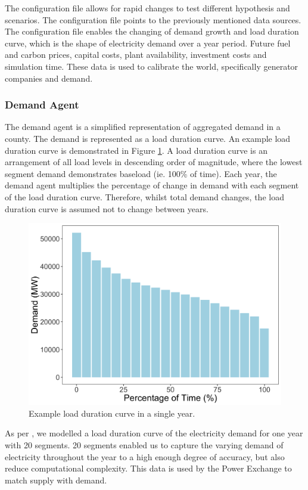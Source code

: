 The configuration file allows for rapid changes to test different hypothesis and scenarios. The configuration file points to the previously mentioned data sources. The configuration file enables the changing of demand growth and load duration curve, which is the shape of electricity demand over a year period. Future fuel and carbon prices, capital costs, plant availability, investment costs and simulation time. These data is used to calibrate the world, specifically generator companies and demand.

\subsubsection{Demand Agent}
The demand agent is a simplified representation of aggregated demand in a county. The demand is represented as a load duration curve. An example load duration curve is demonstrated in Figure \ref{fig:loaddurationcurve}. A load duration curve is an arrangement of all load levels in descending order of magnitude, where the lowest segment demand demonstrates baseload (ie. 100\% of time). Each year, the demand agent multiplies the percentage of change in demand with each segment of the load duration curve. Therefore, whilst total demand changes, the load duration curve is assumed not to change between years.

\begin{figure}
	\centering
	\includegraphics[width=0.95\linewidth]{figures/load_duration_curve}
	\caption{Example load duration curve in a single year.}
	\label{fig:loaddurationcurve}
\end{figure}

As per \cite{Chappin2017}, we modelled a load duration curve of the electricity demand for one year with 20 segments. 20 segments enabled us to capture the varying demand of electricity throughout the year to a high enough degree of accuracy, but also reduce computational complexity. 
This data is used by the Power Exchange to match supply with demand.



